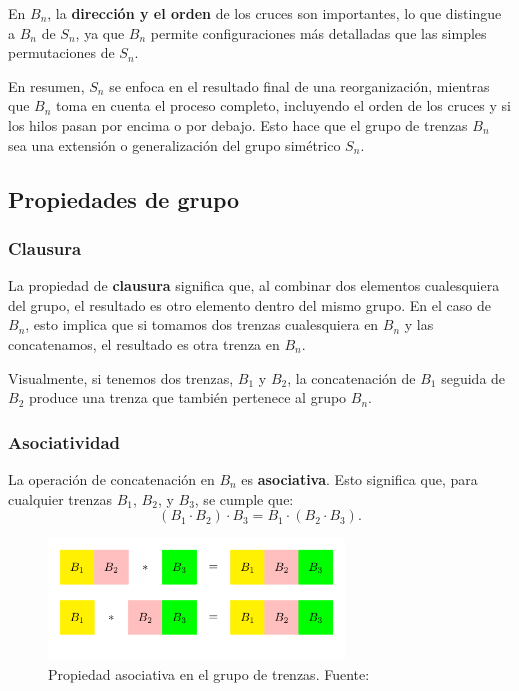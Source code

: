 
En \( B_n \), la \textbf{dirección y el orden} de los cruces son importantes, lo que distingue a \( B_n \) de \( S_n \), ya que \( B_n \) permite configuraciones más detalladas que las simples permutaciones de \( S_n \).

\bigskip

En resumen, \( S_n \) se enfoca en el resultado final de una reorganización, mientras que \( B_n \) toma en cuenta el proceso completo, incluyendo el orden de los cruces y si los hilos pasan por encima o por debajo. Esto hace que el grupo de trenzas \( B_n \) sea una extensión o generalización del grupo simétrico \( S_n \).

\subsection{Propiedades de grupo}

\subsubsection{Clausura}

La propiedad de \textbf{clausura} significa que, al combinar dos elementos cualesquiera del grupo, el resultado es otro elemento dentro del mismo grupo. En el caso de \( B_n \), esto implica que si tomamos dos trenzas cualesquiera en \( B_n \) y las concatenamos, el resultado es otra trenza en \( B_n \).

Visualmente, si tenemos dos trenzas, \( B_1 \) y \( B_2 \), la concatenación de \( B_1 \) seguida de \( B_2 \) produce una trenza que también pertenece al grupo \( B_n \).

\subsubsection{Asociatividad}

La operación de concatenación en \( B_n \) es \textbf{asociativa}. Esto significa que, para cualquier trenzas \( B_1 \), \( B_2 \), y \( B_3 \), se cumple que:
\[
(B_1 \cdot B_2) \cdot B_3 = B_1 \cdot (B_2 \cdot B_3).
\]

\begin{figure}[h!]
    \centering
    \includegraphics[width=0.7\textwidth]{figures/chapters/1_def_grupo/asociativa.png}
    \caption{Propiedad asociativa en el grupo de trenzas. Fuente: \cite{ArithmeticBraids}}
    \label{fig:propiedad_asociativa}
\end{figure}

